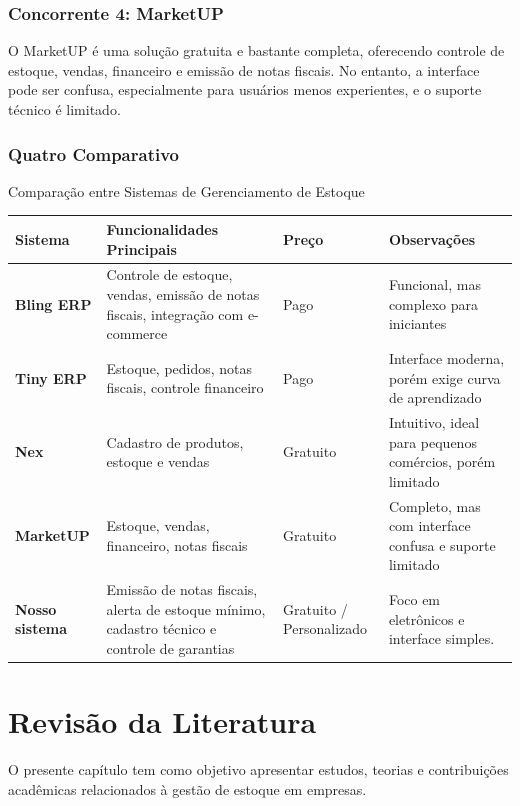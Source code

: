 \documentclass[
	12pt,				%
	openany,			%
	twoside,			%
	a4paper,			%
	english,			%
	brazil				%
	]{abntex2}
\begin{document}
\subsection{Concorrente 4: MarketUP}
O MarketUP é uma solução gratuita e bastante completa, oferecendo controle de estoque, vendas, financeiro e emissão de notas fiscais. No entanto, a interface pode ser confusa, especialmente para usuários menos experientes, e o suporte técnico é limitado.

\subsection{Quatro Comparativo}

\begin{quadro}[htb]
\caption{\label{quadro_comparativo}Comparação entre Sistemas de Gerenciamento de Estoque}
\begin{tabular}{|p{3.2cm}|p{5.5cm}|p{2.2cm}|p{4.1cm}|}
\hline
\textbf{Sistema} & \textbf{Funcionalidades Principais} & \textbf{Preço} & \textbf{Observações} \\
\hline
\textbf{Bling ERP} & Controle de estoque, vendas, emissão de notas fiscais, integração com e-commerce & Pago & Funcional, mas complexo para iniciantes \\
\hline
\textbf{Tiny ERP} & Estoque, pedidos, notas fiscais, controle financeiro & Pago & Interface moderna, porém exige curva de aprendizado \\
\hline
\textbf{Nex} & Cadastro de produtos, estoque e vendas & Gratuito & Intuitivo, ideal para pequenos comércios, porém limitado \\
\hline
\textbf{MarketUP} & Estoque, vendas, financeiro, notas fiscais & Gratuito & Completo, mas com interface confusa e suporte limitado \\
\hline
\textbf{Nosso sistema} & Emissão de notas fiscais, alerta de estoque mínimo, cadastro técnico e controle de garantias & Gratuito / Personalizado & Foco em eletrônicos e interface simples. \\
\hline
\end{tabular}
\end{quadro}



\chapter{Revisão da Literatura}
O presente capítulo tem como objetivo apresentar estudos, teorias e contribuições acadêmicas relacionados à gestão de estoque em empresas.
\end{document}
